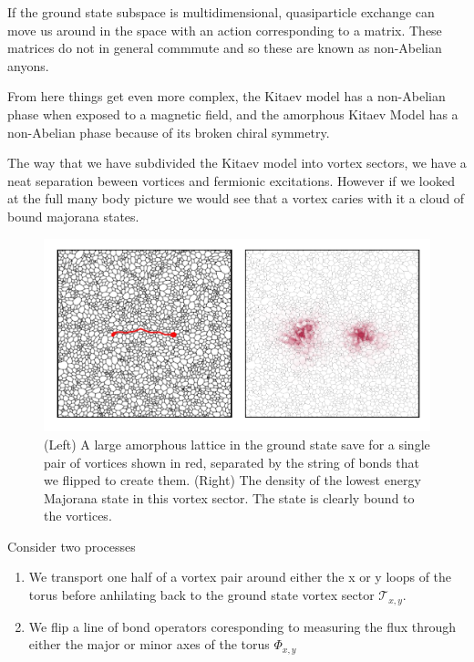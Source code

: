 If the ground state subspace is multidimensional, quasiparticle exchange
can move us around in the space with an action corresponding to a
matrix. These matrices do not in general commmute and so these are known
as non-Abelian anyons.

From here things get even more complex, the Kitaev model has a
non-Abelian phase when exposed to a magnetic field, and the amorphous
Kitaev Model has a non-Abelian phase because of its broken chiral
symmetry.

The way that we have subdivided the Kitaev model into vortex sectors, we
have a neat separation beween vortices and fermionic excitations.
However if we looked at the full many body picture we would see that a
vortex caries with it a cloud of bound majorana states.

\begin{figure}
\hypertarget{fig:majorana_bound_states}{%
\centering
\includegraphics[width=1\textwidth,height=\textheight]{figure_code/amk_chapter/majorana_bound_states/majorana_bound_states.pdf}
\caption{(Left) A large amorphous lattice in the ground state save for a
single pair of vortices shown in red, separated by the string of bonds
that we flipped to create them. (Right) The density of the lowest energy
Majorana state in this vortex sector. The state is clearly bound to the
vortices.}\label{fig:majorana_bound_states}
}
\end{figure}

Consider two processes

\begin{enumerate}
\def\labelenumi{\arabic{enumi})}
\item
  We transport one half of a vortex pair around either the x or y loops
  of the torus before anhilating back to the ground state vortex sector
  \(\mathcal{T}_{x,y}\).
\item
  We flip a line of bond operators coresponding to measuring the flux
  through either the major or minor axes of the torus
  \(\mathcal{\Phi}_{x,y}\)
\end{enumerate}

